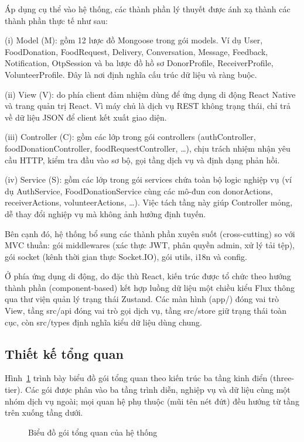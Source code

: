 \documentclass[../main.tex]{subfiles}%
\begin{document}
Áp dụng cụ thể vào hệ thống, các thành phần lý thuyết được ánh xạ thành các thành phần thực tế như sau:

(i) Model (M): gồm 12 lược đồ Mongoose trong gói models. Ví dụ User, FoodDonation, FoodRequest, Delivery, Conversation, Message, Feedback, Notification, OtpSession và ba lược đồ hồ sơ DonorProfile, ReceiverProfile, VolunteerProfile. Đây là nơi định nghĩa cấu trúc dữ liệu và ràng buộc.

(ii) View (V): do phía client đảm nhiệm dùng để ứng dụng di động React Native và trang quản trị React. Vì máy chủ là dịch vụ REST không trạng thái, chỉ trả về dữ liệu JSON để client kết xuất giao diện.

(iii) Controller (C): gồm các lớp trong gói controllers (authController, foodDonationController, foodRequestController, \ldots), chịu trách nhiệm nhận yêu cầu HTTP, kiểm tra đầu vào sơ bộ, gọi tầng dịch vụ và định dạng phản hồi.
  
(iv) Service (S): gồm các lớp trong gói services chứa toàn bộ logic nghiệp vụ (ví dụ AuthService, FoodDonationService cùng các mô-đun con donorActions, receiverActions, volunteerActions, \ldots). Việc tách tầng này giúp Controller mỏng, dễ thay đổi nghiệp vụ mà không ảnh hưởng định tuyến.

Bên cạnh đó, hệ thống bổ sung các thành phần xuyên suốt (cross-cutting) so với MVC thuần: gói middlewares (xác thực JWT, phân quyền admin, xử lý tải tệp), gói socket (kênh thời gian thực Socket.IO), gói utils, i18n và config.

Ở phía ứng dụng di động, do đặc thù React, kiến trúc được tổ chức theo hướng thành phần (component-based) kết hợp luồng dữ liệu một chiều kiểu Flux thông qua thư viện quản lý trạng thái Zustand. Các màn hình (app/) đóng vai trò View, tầng src/api đóng vai trò gọi dịch vụ, tầng src/store giữ trạng thái toàn cục, còn src/types định nghĩa kiểu dữ liệu dùng chung.

\subsection{Thiết kế tổng quan}
\label{subsection:4.1.2}

Hình~\ref{fig:pkg_tongquan} trình bày biểu đồ gói tổng quan theo kiến trúc ba tầng kinh điển (three-tier). Các gói được phân vào ba tầng trình diễn, nghiệp vụ và dữ liệu cùng một nhóm dịch vụ ngoài; mọi quan hệ phụ thuộc (mũi tên nét đứt) đều hướng từ tầng trên xuống tầng dưới.

\begin{figure}[H]
    \centering
    \caption{Biểu đồ gói tổng quan của hệ thống}
    \label{fig:pkg_tongquan}
\end{figure}
\end{document}
